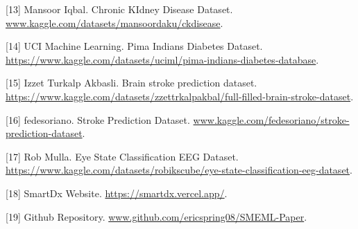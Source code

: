 \documentclass{article}
\begin{document}
{[13] Mansoor Iqbal. Chronic KIdney Disease Dataset. \url{www.kaggle.com/datasets/mansoordaku/ckdisease}.

[14] UCI Machine Learning. Pima Indians Diabetes Dataset. \url{https://www.kaggle.com/datasets/uciml/pima-indians-diabetes-database}.

[15] Izzet Turkalp Akbasli. Brain stroke prediction dataset. \url{https://www.kaggle.com/datasets/zzettrkalpakbal/full-filled-brain-stroke-dataset}.

[16] fedesoriano. Stroke Prediction Dataset. \url{www.kaggle.com/fedesoriano/stroke-prediction-dataset}.

[17] Rob Mulla. Eye State Classification EEG Dataset. \url{https://www.kaggle.com/datasets/robikscube/eye-state-classification-eeg-dataset}.

[18] SmartDx Website. \url{https://smartdx.vercel.app/}.

[19] Github Repository. \url{www.github.com/ericspring08/SMEML-Paper}.
}
\end{document}
